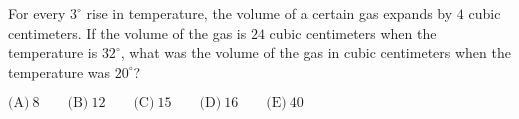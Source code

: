 

For every $3^\circ$ rise in temperature, the volume of a certain gas expands by $4$ cubic centimeters. If the volume of the gas is $24$ cubic centimeters when the temperature is $32^\circ$, what was the volume of the gas in cubic centimeters when the temperature was $20^\circ$?

$\text{(A)}\ 8 \qquad \text{(B)}\ 12 \qquad \text{(C)}\ 15 \qquad \text{(D)}\ 16 \qquad \text{(E)}\ 40$

